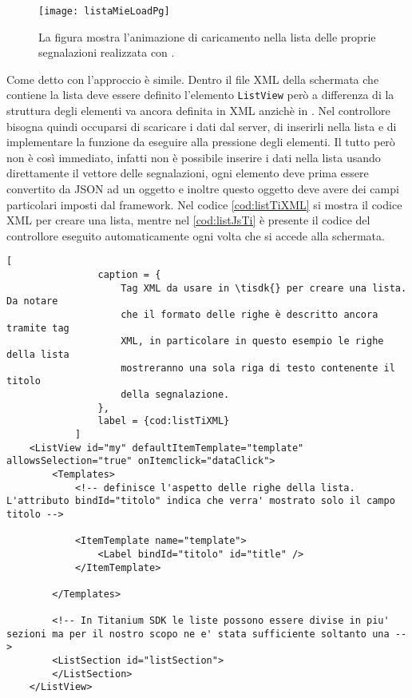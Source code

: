             \begin{figure}[H]
                \centering
                \texttt{[image: listaMieLoadPg]}
                \caption{La figura mostra l'animazione di caricamento nella lista
                delle proprie segnalazioni realizzata con \kendomob{}.
                }
                \label{fig:listaMieLoadPg}
            \end{figure}

            \noindent Come detto con \tisdk{} l'approccio è simile. Dentro
            il file XML della schermata che contiene la lista deve essere definito
            l'elemento \texttt{ListView} però a differenza di \kendomob{} la struttura
            degli elementi va ancora definita in XML anzichè in \js{}. Nel controllore
            bisogna quindi occuparsi di scaricare i dati dal
            server, di inserirli nella lista e di implementare la funzione
            da eseguire alla pressione degli elementi. Il tutto però non è così immediato,
            infatti non è possibile inserire i dati nella lista usando direttamente
            il vettore delle segnalazioni, ogni elemento deve prima essere convertito
            da JSON ad un oggetto \js{} e inoltre questo oggetto deve avere dei
            campi particolari imposti dal framework. Nel codice \ref{cod:listTiXML} si mostra il
            codice XML per creare una lista, mentre nel \ref{cod:listJsTi} è presente il codice
            \js{} del controllore eseguito automaticamente ogni volta che si
            accede alla schermata.
            \begin{lstlisting}[
                caption = {
                    Tag XML da usare in \tisdk{} per creare una lista. Da notare
                    che il formato delle righe è descritto ancora tramite tag
                    XML, in particolare in questo esempio le righe della lista
                    mostreranno una sola riga di testo contenente il titolo
                    della segnalazione.
                },
                label = {cod:listTiXML}
            ]
    <ListView id="my" defaultItemTemplate="template" allowsSelection="true" onItemclick="dataClick">
        <Templates>
            <!-- definisce l'aspetto delle righe della lista. L'attributo bindId="titolo" indica che verra' mostrato solo il campo titolo -->

            <ItemTemplate name="template">
                <Label bindId="titolo" id="title" />
            </ItemTemplate>

        </Templates>

        <!-- In Titanium SDK le liste possono essere divise in piu' sezioni ma per il nostro scopo ne e' stata sufficiente soltanto una -->
        <ListSection id="listSection">
        </ListSection>
    </ListView>
            \end{lstlisting}

